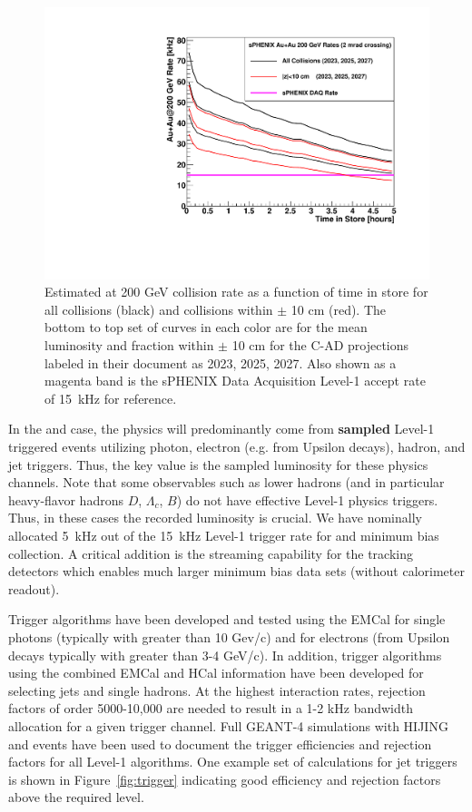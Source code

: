\begin{figure}
\centering
\includegraphics[width=0.70\linewidth]{figs/figure_auauratestore_2mrad.pdf} 
\caption{Estimated \auau at 200 GeV collision rate as a function of time in store for all collisions (black) and collisions within $\pm$ 10 cm (red).  The bottom to top set of curves in each color are for the mean luminosity and fraction within $\pm$ 10 cm for the C-AD projections labeled in their document as 2023, 2025, 2027.   Also shown as a magenta band is the sPHENIX Data Acquisition Level-1 accept rate of 15~kHz for reference.
\label{fig:auaulumcurves}}
\end{figure}

In the \pp and \pau case, the physics will predominantly come from {\bf sampled} Level-1 triggered events utilizing photon, electron (e.g. from Upsilon decays), hadron, and
jet triggers.  Thus, the key value is the sampled luminosity for these physics channels.   Note that some observables such as lower \pt hadrons (and in particular heavy-flavor hadrons $D$, $\Lambda_{c}$, $B$) do not have effective Level-1 physics triggers.    Thus, in these cases the recorded luminosity is crucial.    We have nominally allocated 5~kHz out of the 15~kHz Level-1 trigger rate for \pp and \pau minimum bias collection.   A critical addition is the streaming capability for the tracking detectors which enables much larger minimum bias data sets (without calorimeter readout).

Trigger algorithms have been developed and tested using the EMCal for single photons (typically with \pt greater than 10 Gev/c) and for electrons (from Upsilon decays typically with \pt greater than 3-4 GeV/c).  In addition, trigger algorithms using the combined EMCal and HCal information have been developed for selecting jets and single hadrons.    At the highest \pp interaction rates, rejection factors of order 5000-10,000 are needed to result in a 1-2 kHz bandwidth allocation for a given trigger channel.    Full {\textsc{GEANT-4}} simulations with {\textsc{HIJING}} \pp and \pau events have been used to document the trigger efficiencies and rejection factors for all Level-1 algorithms.
One example set of calculations for jet triggers is shown in Figure~\ref{fig:trigger} indicating good efficiency and rejection factors above the required level.


